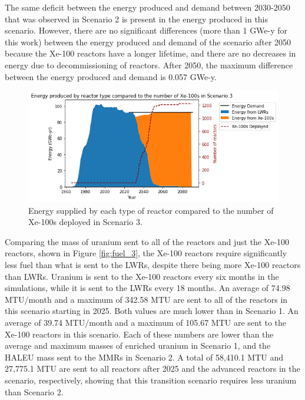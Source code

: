 The same deficit between the energy produced and demand between 
2030-2050 that was observed in Scenario 2 is present in the energy produced 
in this scenario. However, there are no significant 
differences (more than 1 GWe-y for this work) between the energy 
produced and demand of the scenario 
after 2050 because the Xe-100 reactors have a longer lifetime, and there are 
no decreases in energy due to decommissioning of reactors. After 2050, the 
maximum difference between the energy produced and demand is 0.057 GWe-y. 

\begin{figure}
    \centering 
    \includegraphics[width=\textwidth]{../figures/energy_scenario3.png}
    \caption{Energy supplied by each type of reactor compared to the number of 
    Xe-100s deployed in Scenario 3.}
    \label{fig:energy_rx_3}
\end{figure}

Comparing the mass of uranium sent to all of the reactors and just the Xe-100 
reactors, shown in Figure \ref{fig:fuel_3}, the Xe-100 reactors 
require significantly less fuel than what is sent to the \glspl{LWR}, 
despite there being more Xe-100 reactors than \glspl{LWR}. Uranium 
is sent to the Xe-100 reactors every six months in the simulations, 
while it is sent to the \glspl{LWR} every 18 months. An average of 
74.98 MTU/month and a maximum of 342.58 MTU are sent to all of the reactors 
in this scenario starting in 2025. Both values are much
lower than in Scenario 1. An average of 39.74 
MTU/month and a maximum of 105.67 MTU are sent to the Xe-100 reactors in 
this scenario. Each of these numbers are lower than the 
average and maximum masses of enriched uranium  
in Scenario 1, and the \gls{HALEU} mass sent to the \glspl{MMR} in 
Scenario 2. A total of 58,410.1 MTU and 27,775.1 MTU are sent to 
all reactors after 2025 and the advanced reactors in the scenario, respectively, 
showing
that this transition scenario requires less uranium than Scenario 2. 

